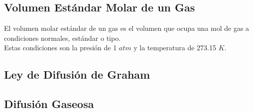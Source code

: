 \documentclass[../main.tex]{subfiles}
\begin{document}
\subsection{Volumen Estándar Molar de un Gas}
El volumen molar estándar de un gas es el volumen que ocupa una mol de gas a 
condiciones normales, estándar o tipo. \\
Estas condiciones son la presión de 1 $atm$
y la temperatura de 273.15 $K$. \cite{lab}
\subsection{Ley de Difusión de Graham}

\subsection{Difusión Gaseosa}
\end{document}
